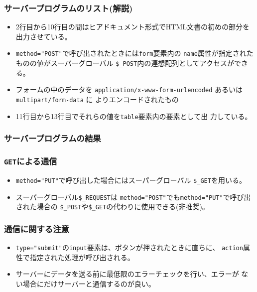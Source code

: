  \begin{frame}[containsverbatim]
 \frametitle{サーバープログラムのリスト(解説)}
 \begin{itemize}
 \item 2行目から10行目の間はヒアドキュメント形式でHTML文書の初めの部分を
       出力させている。
 \item \Verb+method="POST"+で呼び出されたときには\texttt{form}要素内の
       \texttt{name}属性が指定されたものの値がスーパーグローバル
       \Verb+$_POST+内の連想配列としてアクセスができる。
  \item フォームの中のデータを
       \texttt{application/x-www-form-urlencoded} あるいは
       \texttt{multipart/form-data} に
       よりエンコードされたもの
 \item 11行目から13行目でそれらの値を\texttt{table}要素内の要素として出
       力している。
 \end{itemize}
 \end{frame}
 \begin{frame}[containsverbatim]
 \frametitle{サーバープログラムの結果}
 \end{frame}
 \begin{frame}[containsverbatim]
 \frametitle{\texttt{GET}による通信}
 \begin{itemize}
 \item \verb+method="PUT"+で呼び出した場合にはスーパーグローバル
 \verb+$_GET+を用いる。
 \item スーパーグローバル\Verb+$_REQUEST+は
 \verb+method="POST"+でも\verb+method="PUT"+で呼び出された場合の
 \verb+$_POST+や\Verb+$_GET+の代わりに使用できる(非推奨)。
 \end{itemize}
 \end{frame}
 \begin{frame}[containsverbatim]
 \frametitle{通信に関する注意}
 \begin{itemize}
 \item \Verb+type="submit"+の\texttt{input}要素は、ボタンが押されたときに直ちに、
 \texttt{action}属性で指定された処理が呼び出される。
 \item サーバーにデータを送る前に最低限のエラーチェックを行い、エラーが
       ない場合にだけサーバーと通信するのが良い。
 \end{itemize}
 \end{frame}
